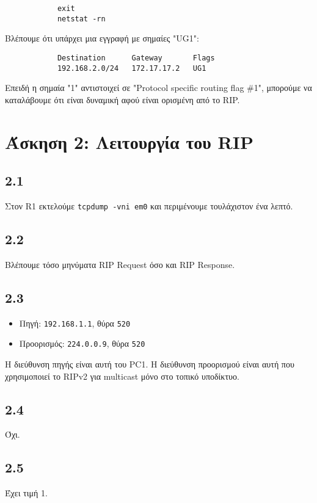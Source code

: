 \documentclass[a4paper, 12pt]{article}
\begin{document}
		\begin{verbatim}
			exit
			netstat -rn
		\end{verbatim}
		
		Βλέπουμε ότι υπάρχει μια εγγραφή με σημαίες "UG1":
		
		\begin{verbatim}
			Destination      Gateway       Flags
			192.168.2.0/24   172.17.17.2   UG1
		\end{verbatim}
		
		Επειδή η σημαία "1" αντιστοιχεί σε "Protocol specific routing flag \#1", μπορούμε να καταλάβουμε ότι είναι δυναμική αφού είναι ορισμένη από το RIP.

\section*{Άσκηση 2: Λειτουργία του RIP}

	\subsection*{2.1}
		Στον R1 εκτελούμε \verb|tcpdump -vni em0| και περιμένουμε τουλάχιστον ένα λεπτό.

	\subsection*{2.2}
		Βλέπουμε τόσο μηνύματα RIP Request όσο και RIP Response.

	\subsection*{2.3}
		\begin{itemize}
			\item Πηγή: \verb|192.168.1.1|, θύρα \verb|520|
			\item Προορισμός: \verb|224.0.0.9|, θύρα \verb|520|
		\end{itemize}
		
		Η διεύθυνση πηγής είναι αυτή του PC1. Η διεύθυνση προορισμού είναι αυτή που χρησιμοποιεί το RIPv2 για multicast μόνο στο τοπικό υποδίκτυο.
		
	\subsection*{2.4}
		Όχι.

	\subsection*{2.5}
		Έχει τιμή 1.
\end{document}
